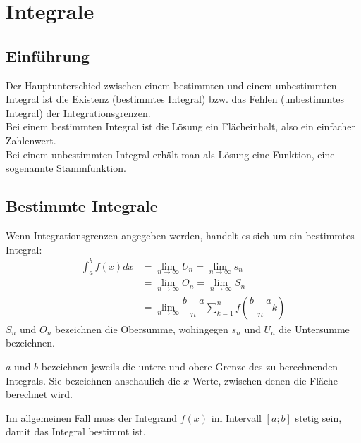 \chapter{Integrale}
\section{Einführung}
Der Hauptunterschied zwischen einem bestimmten und einem unbestimmten Integral ist die Existenz (bestimmtes Integral) bzw. das Fehlen
(unbestimmtes Integral) der Integrationsgrenzen.\\
Bei einem bestimmten Integral ist die Lösung ein Flächeinhalt, also ein einfacher Zahlenwert.\\
Bei einem unbestimmten Integral erhält man als Lösung eine Funktion, eine sogenannte Stammfunktion.\\


\section{Bestimmte Integrale}
\begin{Definition}
  Wenn Integrationsgrenzen angegeben werden, handelt es sich um ein bestimmtes Integral:
  \begin{align*}
    \int_{a}^{b} f(x)dx & = \lim\limits_{n \rightarrow \infty} U_n = \lim\limits_{n \rightarrow \infty} s_n\\
                        & = \lim\limits_{n \rightarrow \infty} O_n = \lim\limits_{n \rightarrow \infty} S_n\\
                        & = \lim\limits_{n \rightarrow \infty} \dfrac{b-a}{n}\sum\limits_{k=1}^{n}f(\dfrac{b-a}{n}k)
  \end{align*}
  $S_n$ und $O_n$ bezeichnen die Obersumme, wohingegen $s_n$ und $U_n$ die Untersumme bezeichnen.
\end{Definition}
\begin{Bemerkung}
  $a$ und $b$ bezeichnen jeweils die untere und obere Grenze des zu berechnenden Integrals. Sie bezeichnen anschaulich die $x$-Werte, zwischen denen die Fläche berechnet wird.
\end{Bemerkung}
\begin{Bemerkung}
  Im allgemeinen Fall muss der Integrand $f(x)$ im Intervall $[a;b]$ stetig sein, damit das Integral bestimmt ist.
\end{Bemerkung}

